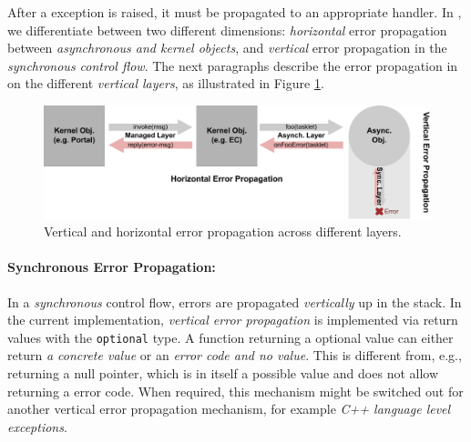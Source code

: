After a exception is raised, it must be propagated to an appropriate handler. In \mythos, we differentiate between two different dimensions: \emph{horizontal} error propagation between \emph{asynchronous and kernel objects}, and \emph{vertical} error propagation in the \emph{synchronous control flow}.  The next paragraphs describe the error propagation in on the different \emph{vertical layers}, as illustrated in Figure \ref{fig:error-propagation}.

\begin{figure}
  \centering
  \includegraphics[width=\textwidth]{fig/error-propagation.pdf}
  \caption{Vertical and horizontal error propagation across different layers.}
  \label{fig:error-propagation}
\end{figure}

\paragraph{Synchronous Error Propagation:}
In a \emph{synchronous} control flow, errors are propagated \emph{vertically} up in the stack. In the  current \mythos implementation, \emph{vertical error propagation} is implemented via return values with the \lstinline$optional$ type. A function returning a optional value can either return \emph{a concrete value} or an \emph{error code and no value}. This is different from, e.g., returning a null pointer, which is in itself a possible value and does not allow returning a error code. When required, this mechanism might be switched out for another vertical error propagation mechanism, for example \emph{C++ language level exceptions}.

